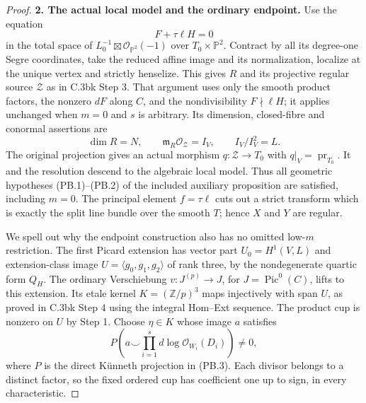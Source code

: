 \begin{proof}
\textbf{2. The actual local model and the ordinary endpoint.}
Use the equation
\[
 F+\tau\ell H=0
 \tag{C.3bl.4}
\]
in the total space of $L_0^{-1}\boxtimes\mathcal O_{\mathbb P^2}(-1)$
over $T_0\times\mathbb P^2$. Contract by all its degree-one Segre
coordinates, take the reduced affine image and its normalization,
localize at the unique vertex and strictly henselize. This gives
$R$ and its projective regular source $\mathcal Z$ as in C.3bk
Step 3. That argument uses only the smooth product factors, the
nonzero $dF$ along $C$, and the nondivisibility $F\nmid\ell H$;
it applies unchanged when $m=0$ and $s$ is arbitrary. Its dimension,
closed-fibre and conormal assertions are
\[
 \dim R=N,\qquad
 \mathfrak m_R\mathcal O_{\mathcal Z}=I_V,
 \qquad I_V/I_V^2=L.
 \tag{C.3bl.5}
\]
The original projection gives an actual morphism
$q:\mathcal Z\to T_0$ with $q|_V=\operatorname{pr}_{T_0}$.
It and the resolution descend to the algebraic local model.
Thus all geometric hypotheses (PB.1)--(PB.2) of the included
auxiliary proposition are satisfied, including $m=0$.
The principal element $f=\tau\ell$ cuts out a strict transform
which is exactly the split line bundle over the smooth $T$;
hence $X$ and $Y$ are regular.

We spell out why the endpoint construction also has no omitted
low-$m$ restriction. The first Picard extension has vector part
$U_0=H^1(V,L)$ and extension-class image
$U=\langle g_0,g_1,g_2\rangle$ of rank three, by the nondegenerate
quartic form $Q_H$. The ordinary Verschiebung
$v:J^{(p)}\to J$, for $J=\operatorname{Pic}^0(C)$, lifts to this
extension. Its etale kernel $K=(\mathbb Z/p)^3$ maps injectively
with span $U$, as proved in C.3bk Step 4 using the integral
Hom--Ext sequence. The product cup is nonzero on $U$ by Step 1.
Choose $\eta\in K$ whose image $a$ satisfies
\[
 P\left(a\smile\prod_{i=1}^s d\log\mathcal O_{W_i}(D_i)\right)\ne0,
 \tag{C.3bl.6}
\]
where $P$ is the direct K\"unneth projection in (PB.3).
Each divisor belongs to a distinct factor, so the fixed ordered
cup has coefficient one up to sign, in every characteristic.


\end{proof}
